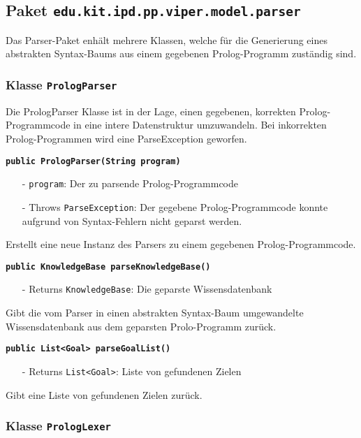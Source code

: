 \documentclass[parskip=full,11pt,twoside]{scrartcl}
\begin{document}
\newpage
\subsection{Paket \texttt{edu.kit.ipd.pp.viper.model.parser}}

Das Parser-Paket enhält mehrere Klassen, welche für die Generierung eines abstrakten Syntax-Baums aus einem gegebenen Prolog-Programm zuständig sind.

\subsubsection{Klasse \texttt{PrologParser}}

Die PrologParser Klasse ist in der Lage, einen gegebenen, korrekten Prolog-Programmcode in eine intere Datenstruktur umzuwandeln. Bei inkorrekten Prolog-Programmen wird eine ParseException geworfen.

\textbf{\texttt{public PrologParser(String program)}}
\begin{itemize}[noitemsep]
	\item[-] \texttt{program}: Der zu parsende Prolog-Programmcode
	\item[-] Throws \texttt{ParseException}: Der gegebene Prolog-Programmcode konnte aufgrund von Syntax-Fehlern nicht geparst werden.
\end{itemize}
Erstellt eine neue Instanz des Parsers zu einem gegebenen Prolog-Programmcode.

\textbf{\texttt{public KnowledgeBase parseKnowledgeBase()}}
\begin{itemize}[noitemsep]
	\item[-] Returns \texttt{KnowledgeBase}: Die geparste Wissensdatenbank
\end{itemize}
Gibt die vom Parser in einen abstrakten Syntax-Baum umgewandelte Wissensdatenbank aus dem geparsten Prolo-Programm zurück.

\textbf{\texttt{public List<Goal> parseGoalList()}}
\begin{itemize}[noitemsep]
	\item[-] Returns \texttt{List<Goal>}: Liste von gefundenen Zielen
\end{itemize}
Gibt eine Liste von gefundenen Zielen zurück.

\subsubsection{Klasse \texttt{PrologLexer}}
\end{document}
